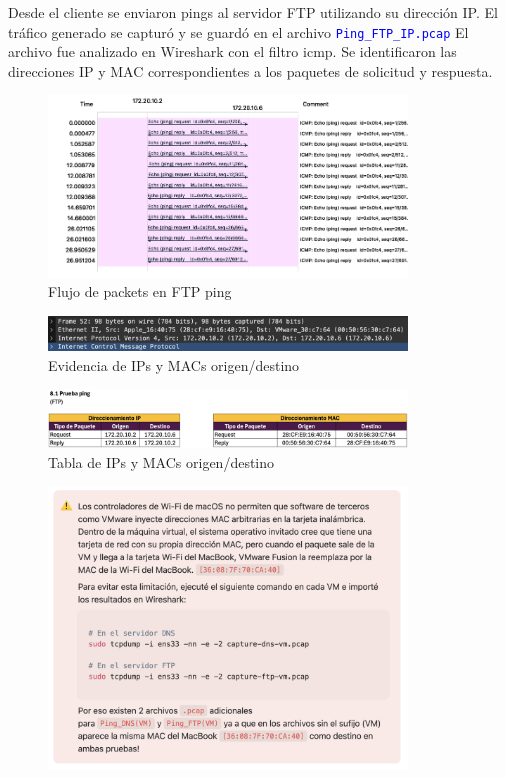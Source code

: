 \documentclass[10pt]{article}
\begin{document}
Desde el cliente se enviaron pings al servidor FTP utilizando su dirección IP. El tráfico generado se capturó y se guardó en el archivo \textcolor{blue}{\texttt{Ping\_FTP\_IP.pcap}} El archivo fue analizado en Wireshark con el filtro icmp. Se identificaron las direcciones IP y MAC correspondientes a los paquetes de solicitud y respuesta.

\begin{figure}[H]
    \centering
    \includegraphics[width=0.85\textwidth]{lab-02-screenshots/8.1-FTP-flow}
    \caption{Flujo de packets en FTP ping}
\end{figure}


\begin{figure}[H]
    \centering
    \includegraphics[width=0.85\textwidth]{lab-02-screenshots/8.1-FTP-data}
    \caption{Evidencia de IPs y MACs origen/destino}
\end{figure}

\begin{figure}[H]
    \centering
    \includegraphics[width=0.85\textwidth]{lab-02-screenshots/8.1-FTP-ping-table}
    \caption{Tabla de IPs y MACs origen/destino}
\end{figure}

\begin{figure}[H]
    \centering
    \includegraphics[width=0.85\textwidth]{lab-02-screenshots/8.1-disclaimer}
\end{figure}
\end{document}
